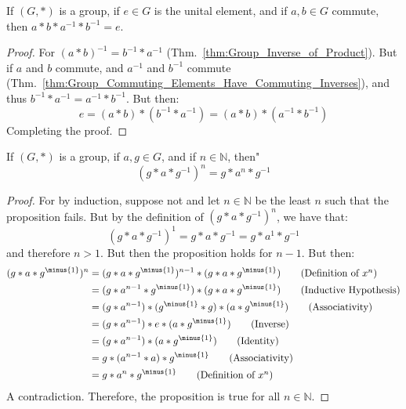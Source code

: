     \begin{theorem}
        If $(G,*)$ is a group, if $e\in{G}$ is the unital element, and if
        $a,b\in{G}$ commute, then $a*b*a^{\minus{1}}*b^{\minus{1}}=e$.
    \end{theorem}
    \begin{proof}
        For $(a*b)^{\minus{1}}=b^{\minus{1}}*a^{\minus{1}}$
        (Thm.~\ref{thm:Group_Inverse_of_Product}). But if $a$ and $b$ commute,
        and $a^{\minus{1}}$ and $b^{\minus{1}}$ commute
        (Thm.~\ref{thm:Group_Commuting_Elements_Have_Commuting_Inverses}),
        and thus $b^{\minus{1}}*a^{\minus{1}}=a^{\minus{1}}*b^{\minus{1}}$.
        But then:
        \begin{equation}
            e=(a*b)*(b^{\minus{1}}*a^{\minus{1}})
            =(a*b)*(a^{\minus{1}}*b^{\minus{1}})
        \end{equation}
        Completing the proof.
    \end{proof}
    \begin{theorem}
        If $(G,*)$ is a group, if $a,g\in{G}$, and if $n\in\mathbb{N}$, then"
        \begin{equation}
            (g*a*g^{\minus{1}})^{n}=g*a^{n}*g^{\minus{1}}
        \end{equation}
    \end{theorem}
    \begin{proof}
        For by induction, suppose not and let $n\in\mathbb{N}$ be the least
        $n$ such that the proposition fails. But by the definition of
        $(g*a*g^{\minus{1}})^{n}$, we have that:
        \begin{equation}
            (g*a*g^{\minus{1}})^{1}=g*a*g^{\minus{1}}=g*a^{1}*g^{\minus{1}}
        \end{equation}
        and therefore $n>1$. But then the proposition holds for $n-1$. But then:
        \begin{align}
            (g*a*g^{\minus{1}})^{n}
            &=(g*a*g^{\minus{1}})^{n-1}*(g*a*g^{\minus{1}})
            \tag{Definition of $x^{n}$}\\
            &=(g*a^{n-1}*g^{\minus{1}})*(g*a*g^{\minus{1}})
            \tag{Inductive Hypothesis}\\
            &=(g*a^{n-1})*(g^{\minus{1}}*g)*(a*g^{\minus{1}})
            \tag{Associativity}\\
            &=(g*a^{n-1})*e*(a*g^{\minus{1}})
            \tag{Inverse}\\
            &=(g*a^{n-1})*(a*g^{\minus{1}})
            \tag{Identity}\\
            &=g*(a^{n-1}*a)*g^{\minus{1}}
            \tag{Associativity}\\
            &=g*a^{n}*g^{\minus{1}}
            \tag{Definition of $x^{n}$}
        \end{align}
        A contradiction. Therefore, the proposition is true for all
        $n\in\mathbb{N}$.
    \end{proof}

